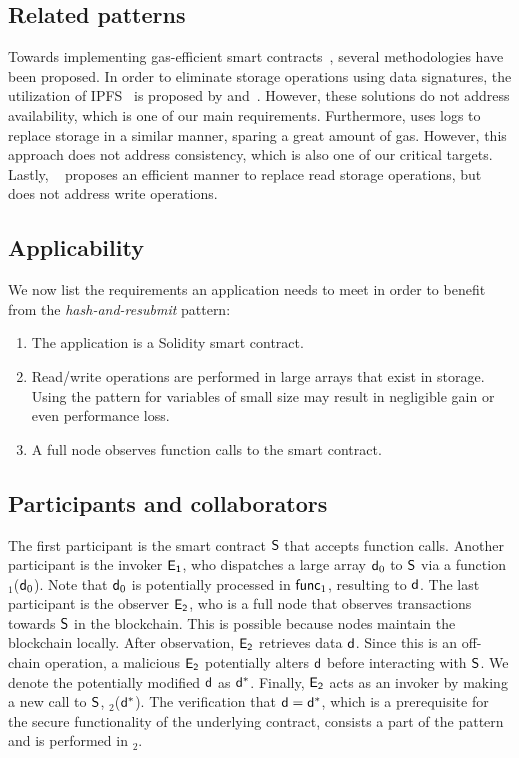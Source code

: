 \subsection{Related patterns} Towards implementing gas-efficient smart
contracts~\cite{contract-opt-1, contract-opt-2, slither, madmax}, several
methodologies have been proposed. In order to eliminate storage operations
using data signatures, the utilization of IPFS~\cite{ipfs} is proposed by
\cite{ipfs-1} and~\cite{ipfs-2}. However, these solutions do not address
availability, which is one of our main requirements. Furthermore,
\cite{logs} uses logs to replace storage in a similar manner, sparing a great
amount of gas. However, this approach does not address consistency, which is
also one of our critical targets. Lastly, ~\cite{memory-array} proposes an
efficient manner to replace read storage operations, but does not address write
operations.

\subsection{Applicability}
We now list the requirements an application needs to meet in order to benefit
from the \emph{hash-and-resubmit} pattern:

\begin{enumerate}
    \item The application is a Solidity smart contract.
    \item Read/write operations are performed in large arrays that exist in
        storage. Using the pattern for variables of small size may result in
        negligible gain or even performance loss.
    \item A full node observes function calls to the smart contract.
\end{enumerate}

\subsection{Participants and collaborators} The first participant is the
smart contract $\mathsf{S}$ that accepts function calls. Another participant is
the invoker $\mathsf{E_{1}}$, who dispatches a large array $\mathsf{d}_0$ to $\mathsf{S}$
via a function \texttt{\proc$_1$}($\mathsf{d}_0$). Note that $\mathsf{d}_0$ is
potentially processed in $\textsf{func}_1$, resulting to $\mathsf{d}$. The last participant
is the observer $\mathsf{E_{2}}$, who is a full node that observes transactions
towards $\mathsf{S}$ in the blockchain. This is possible because nodes maintain
the blockchain locally. After observation, $\mathsf{E_{2}}$ retrieves data $\mathsf{d}$.
Since this is an off-chain operation, a malicious $\mathsf{E_{2}}$ potentially
alters $\mathsf{d}$ before interacting with $\mathsf{S}$. We denote the
potentially modified $\mathsf{d}$ as $\mathsf{d^*}$. Finally, $\mathsf{E_{2}}$ acts as an
invoker by making a new call to $\mathsf{S}$, \texttt{\proc$_2$}($\mathsf{d^*}$). The
verification that $\mathsf{d} = \mathsf{d^*}$, which is a prerequisite for the secure
functionality of the underlying contract, consists a part of the pattern and is
performed in \texttt{\proc$_2$}.

